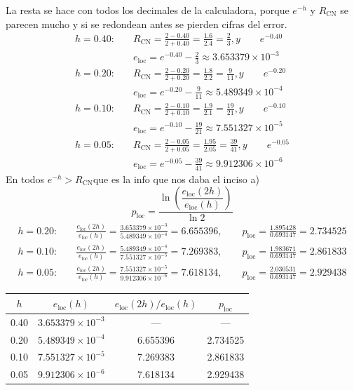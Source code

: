 La resta se hace con todos los decimales de la calculadora, porque $e^{-h}$ y $R_{\mathrm{CN}}$ se parecen mucho y si se
redondean antes se pierden cifras del error.
\begin{align*}
	h = 0.40:&\quad R_{\mathrm{CN}} = \frac{2 - 0.40}{2 + 0.40} = \frac{1.6}{2.4} = \frac23, y
	\qquad e^{-0.40} \\
	&\quad e_{\mathrm{loc}} = e^{-0.40} - \frac23 \approx 3.653379\times10^{-3}\\[6pt]
	h = 0.20:&\quad R_{\mathrm{CN}} = \frac{2 - 0.20}{2 + 0.20} = \frac{1.8}{2.2} = \frac{9}{11} , y
	\qquad e^{-0.20} \\
	&\quad e_{\mathrm{loc}} = e^{-0.20} - \frac{9}{11} \approx 5.489349\times10^{-4}\\[6pt]
	h = 0.10:&\quad R_{\mathrm{CN}} = \frac{2 - 0.10}{2 + 0.10} = \frac{1.9}{2.1} = \frac{19}{21} , y
	\qquad e^{-0.10} \\
	&\quad e_{\mathrm{loc}} = e^{-0.10} - \frac{19}{21} \approx 7.551327\times10^{-5}\\[6pt]
	h = 0.05:&\quad R_{\mathrm{CN}} = \frac{2 - 0.05}{2 + 0.05} = \frac{1.95}{2.05} = \frac{39}{41} , y
	\qquad e^{-0.05} \\
	&\quad e_{\mathrm{loc}} = e^{-0.05} - \frac{39}{41} \approx 9.912306\times10^{-6}
\end{align*}
En todos $e^{-h} > R_{\mathrm{CN}}$que es la info que nos daba el inciso a)
\[
p_{\mathrm{loc}} = \frac{\ln\!\left(\dfrac{e_{\mathrm{loc}}(2h)}{e_{\mathrm{loc}}(h)}\right)}{\ln 2}
\]
\begin{align*}
	h = 0.20:&\quad \frac{e_{\mathrm{loc}}(2h)}{e_{\mathrm{loc}}(h)} = \frac{3.653379\times10^{-3}}{5.489349\times10^{-4}} = 6.655396,
	\qquad p_{\mathrm{loc}} = \frac{1.895428}{0.693147} = 2.734525\\
	h = 0.10:&\quad \frac{e_{\mathrm{loc}}(2h)}{e_{\mathrm{loc}}(h)} = \frac{5.489349\times10^{-4}}{7.551327\times10^{-5}} = 7.269383,
	\qquad p_{\mathrm{loc}} = \frac{1.983671}{0.693147} = 2.861833\\
	h = 0.05:&\quad \frac{e_{\mathrm{loc}}(2h)}{e_{\mathrm{loc}}(h)} = \frac{7.551327\times10^{-5}}{9.912306\times10^{-6}} = 7.618134,
	\qquad p_{\mathrm{loc}} = \frac{2.030531}{0.693147} = 2.929438
\end{align*}
\begin{center}
	\begin{tabular}{cccc}\toprule
		$h$ & $e_{\mathrm{loc}}(h)$ & $e_{\mathrm{loc}}(2h)/e_{\mathrm{loc}}(h)$ & $p_{\mathrm{loc}}$\\\midrule
		0.40 & $3.653379\times10^{-3}$ & ---      & ---      \\
		0.20 & $5.489349\times10^{-4}$ & 6.655396 & 2.734525 \\
		0.10 & $7.551327\times10^{-5}$ & 7.269383 & 2.861833 \\
		0.05 & $9.912306\times10^{-6}$ & 7.618134 & 2.929438 \\\bottomrule
	\end{tabular}
\end{center}

